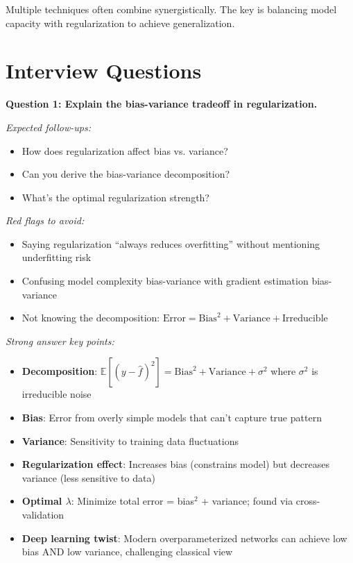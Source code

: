 \documentclass[../../main.tex]{subfiles}
\begin{document}
Multiple techniques often combine synergistically. The key is balancing model capacity with regularization to achieve generalization.

\section*{Interview Questions}
\begin{interviewquestions}

\textbf{Question 1: Explain the bias-variance tradeoff in regularization.}

\textit{Expected follow-ups:}
\begin{itemize}
    \item How does regularization affect bias vs. variance?
    \item Can you derive the bias-variance decomposition?
    \item What's the optimal regularization strength?
\end{itemize}

\textit{Red flags to avoid:}
\begin{itemize}
    \item Saying regularization ``always reduces overfitting'' without mentioning underfitting risk
    \item Confusing model complexity bias-variance with gradient estimation bias-variance
    \item Not knowing the decomposition: $\text{Error} = \text{Bias}^2 + \text{Variance} + \text{Irreducible}$
\end{itemize}

\textit{Strong answer key points:}
\begin{itemize}
    \item \textbf{Decomposition}: $\mathbb{E}[(y - \hat{f})^2] = \text{Bias}^2 + \text{Variance} + \sigma^2$ where $\sigma^2$ is irreducible noise
    \item \textbf{Bias}: Error from overly simple models that can't capture true pattern
    \item \textbf{Variance}: Sensitivity to training data fluctuations
    \item \textbf{Regularization effect}: Increases bias (constrains model) but decreases variance (less sensitive to data)
    \item \textbf{Optimal $\lambda$}: Minimize total error = bias$^2$ + variance; found via cross-validation
    \item \textbf{Deep learning twist}: Modern overparameterized networks can achieve low bias AND low variance, challenging classical view
\end{itemize}


\end{interviewquestions}
\end{document}

